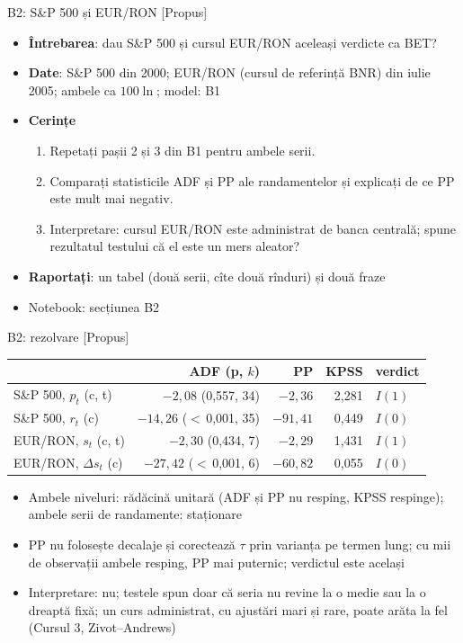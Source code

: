 \begin{frame}{B2: S\&P 500 și EUR/RON [Propus]}
\itemsize{\footnotesize}
\begin{itemize}
\item \textbf{Întrebarea}: dau S\&P 500 și cursul EUR/RON aceleași verdicte ca BET?
\item \textbf{Date}: S\&P 500 din 2000; EUR/RON (cursul de referință BNR) din iulie 2005; ambele ca $100\ln$; model: B1
\item \textbf{Cerințe}
\begin{enumerate}
    \item Repetați pașii 2 și 3 din B1 pentru ambele serii.
    \item Comparați statisticile ADF și PP ale randamentelor și explicați de ce PP este mult mai negativ.
    \item Interpretare: cursul EUR/RON este administrat de banca centrală; spune rezultatul testului că el este un mers aleator?
\end{enumerate}
\item \textbf{Raportați}: un tabel (două serii, cîte două rînduri) și două fraze
\item Notebook: secțiunea B2
\end{itemize}
\end{frame}

\ifsolutions
\begin{frame}{B2: rezolvare [Propus]}
\itemsize{\scriptsize}
\begin{center}
\scriptsize
\begin{tabular}{lrrrl}
\toprule
& ADF (p, $k$) & PP & KPSS & \textbf{verdict} \\
\midrule
S\&P 500, $p_t$ (c, t) & $-2{,}08$ (0{,}557, 34) & $-2{,}36$ & 2{,}281 & $I(1)$ \\
S\&P 500, $r_t$ (c) & $-14{,}26$ ($<$\,0{,}001, 35) & $-91{,}41$ & 0{,}449 & $I(0)$ \\
EUR/RON, $s_t$ (c, t) & $-2{,}30$ (0{,}434, 7) & $-2{,}29$ & 1{,}431 & $I(1)$ \\
EUR/RON, $\Delta s_t$ (c) & $-27{,}42$ ($<$\,0{,}001, 6) & $-60{,}82$ & 0{,}055 & $I(0)$ \\
\bottomrule
\end{tabular}
\end{center}
\begin{itemize}
    \item Ambele niveluri: rădăcină unitară (ADF și PP nu resping, KPSS respinge); ambele serii de randamente: staționare
    \item PP nu folosește decalaje și corectează $\tau$ prin varianța pe termen lung; cu mii de observații ambele resping, PP mai puternic; verdictul este același
    \item Interpretare: nu; testele spun doar că seria nu revine la o medie sau la o dreaptă fixă; un curs administrat, cu ajustări mari și rare, poate arăta la fel (Cursul 3, Zivot--Andrews)
\end{itemize}
\end{frame}
\fi

